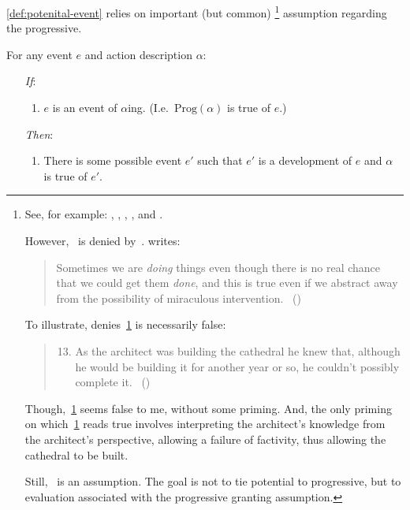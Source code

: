 \begin{note}
  \autoref{def:potenital-event} relies on important (but common)%
  \footnote{
    See, for example:
    \textcite{Bennett:1972uw},
    \textcite{Dowty:1979vq},
    \textcite{Parsons:1990aa},
    \textcite{Landman:1992wh}, and
    \textcite{Portner:1998um}.

    However,~ is denied by~\textcite{Szabo:2004ul}.
    \citeauthor{Szabo:2004ul} writes:
    \begin{quote}
      Sometimes we are \emph{doing} things even though there is no real chance that we could get them \emph{done}, and this is true even if we abstract away from the possibility of miraculous intervention.%
      \mbox{ }\hfill\mbox{(\citeyear[40]{Szabo:2004ul})}
    \end{quote}
    To illustrate, \citeauthor{Szabo:2004ul} denies~\ref{Szabo:Arch} is necessarily false:
    \begin{quote}
      \begin{enumerate}[label=(\arabic*), ref=(\arabic*)]
        \setcounter{enumi}{12}
      \item
        \label{Szabo:Arch}
        As the architect was building the cathedral he knew that, although he would be building it for another year or so, he couldn't possibly complete it.%
        \mbox{ }\hfill\mbox{(\citeyear[38]{Szabo:2004ul})}
      \end{enumerate}
    \end{quote}
    Though,~\ref{Szabo:Arch} seems false to me, without some priming.
    And, the only priming on which~\ref{Szabo:Arch} reads true involves interpreting the architect's knowledge from the architect's perspective, allowing a failure of factivity, thus allowing the cathedral to be built.

    Still,~ is an assumption.
    The goal is not to tie potential to progressive, but to evaluation associated with the progressive granting assumption.
  }
  assumption regarding the progressive.

  \begin{assumption}[\assuPP{2}]
    \label{assu:PP}
    For any event \(e\) and action description \(\alpha\):
    \begin{enumerate}
    \item[\emph{If}:]
      \begin{enumerate}[label=\alph*., ref=(\alph*)]
      \item
        \(e\) is an event of \(\alpha\)ing.%
        \hfill(I.e.\ \(\text{Prog}(\alpha)\) is true of \(e\).)
      \end{enumerate}
    \item[\emph{Then}:]
      \begin{enumerate}[label=\alph*., ref=(\alph*), resume]
      \item
        There is some possible event \(e'\) such that \(e'\) is a development of \(e\) and \(\alpha\) is true of \(e'\).
      \end{enumerate}
    \end{enumerate}
    \vspace{-\baselineskip}
  \end{assumption}


\end{note}
